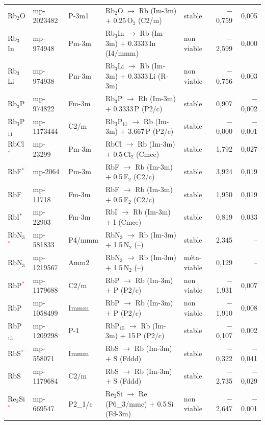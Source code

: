 \begin{longtable}{@{}ll l@{\hspace{4pt}} p{4.6cm} l@{\hspace{4pt}} rr@{}}
Rb$_{2}$O & mp-2023482 & P-3m1 & Rb$_{2}$O $\to$ Rb (Im-3m) $+$ 0.25\,O$_{2}$ (C2/m) & stable & $-$0{,}759 & 0{,}005 \\
Rb$_{3}$In & mp-974948 & Pm-3m & Rb$_{3}$In $\to$ Rb (Im-3m) $+$ 0.3333\,In (I4/mmm) & non viable & $-$2{,}599 & 0{,}000 \\
Rb$_{3}$Li & mp-974938 & Pm-3m & Rb$_{3}$Li $\to$ Rb (Im-3m) $+$ 0.3333\,Li (R-3m) & non viable & $-$0{,}756 & 0{,}003 \\
Rb$_{3}$P & mp-974822 & Fm-3m & Rb$_{3}$P $\to$ Rb (Im-3m) $+$ 0.3333\,P (P2/c) & stable & 0{,}907 & $-$0{,}002 \\
Rb$_{3}$P$_{11}$ & mp-1173444 & C2/m & Rb$_{3}$P$_{11}$ $\to$ Rb (Im-3m) $+$ 3.667\,P (P2/c) & stable & $-$0{,}000 & $-$0{,}001 \\
RbCl\textcolor{red}{$^*$} & mp-23299 & Pm-3m & RbCl $\to$ Rb (Im-3m) $+$ 0.5\,Cl$_{2}$ (Cmce) & stable & 1{,}792 & 0{,}027 \\
RbF\textcolor{red}{$^*$} & mp-2064 & Pm-3m & RbF $\to$ Rb (Im-3m) $+$ 0.5\,F$_{2}$ (C2/c) & stable & 3{,}924 & 0{,}019 \\
RbF & mp-11718 & Fm-3m & RbF $\to$ Rb (Im-3m) $+$ 0.5\,F$_{2}$ (C2/c) & stable & 1{,}950 & 0{,}019 \\
RbI$^*$ & mp-22903 & Fm-3m & RbI $\to$ Rb (Im-3m) $+$ I (Cmce) & stable & 0{,}819 & 0{,}033 \\
RbN$_{3}$\textcolor{red}{$^*$} & mp-581833 & P4/mmm & RbN$_{3}$ $\to$ Rb (Im-3m) $+$ 1.5\,N$_{2}$ (--) & stable & 2{,}345 & -- \\
RbN$_{3}$ & mp-1219567 & Amm2 & RbN$_{3}$ $\to$ Rb (Im-3m) $+$ 1.5\,N$_{2}$ (--) & m\'eta-viable & 0{,}129 & -- \\
RbP\textcolor{red}{$^*$} & mp-1179688 & C2/m & RbP $\to$ Rb (Im-3m) $+$ P (P2/c) & non viable & $-$1{,}931 & 0{,}007 \\
RbP & mp-1058499 & Immm & RbP $\to$ Rb (Im-3m) $+$ P (P2/c) & non viable & $-$1{,}910 & 0{,}008 \\
RbP$_{15}$ & mp-1209298 & P-1 & RbP$_{15}$ $\to$ Rb (Im-3m) $+$ 15\,P (P2/c) & stable & $-$0{,}107 & 0{,}002 \\
RbS\textcolor{red}{$^*$} & mp-558071 & Immm & RbS $\to$ Rb (Im-3m) $+$ S (Fddd) & stable & $-$0{,}322 & $-$0{,}041 \\
RbS & mp-1179684 & C2/m & RbS $\to$ Rb (Im-3m) $+$ S (Fddd) & stable & $-$2{,}735 & $-$0{,}029 \\
Re$_{2}$Si\textcolor{red}{$^*$} & mp-669547 & P2\_1/c & Re$_{2}$Si $\to$ Re (P6\_3/mmc) $+$ 0.5\,Si (Fd-3m) & non viable & $-$2{,}647 & $-$0{,}001 \\

\end{longtable}
